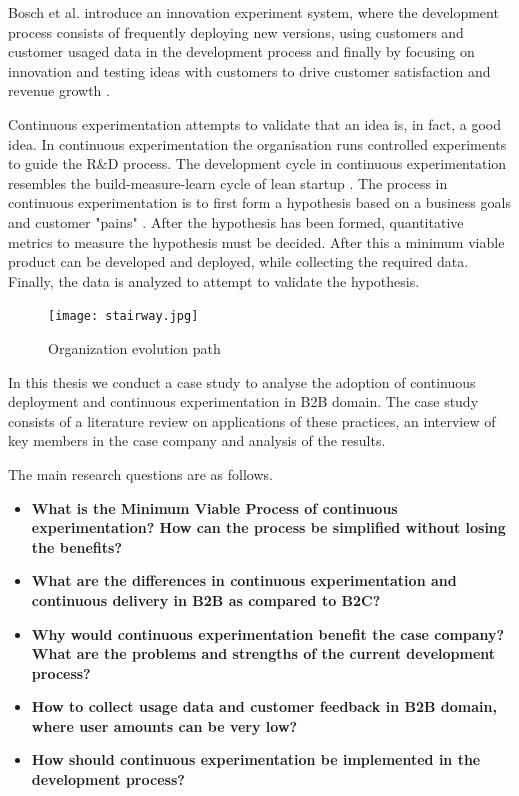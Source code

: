 \documentclass[english]{tktltiki2}
\theoremstyle{definition}
\theoremstyle{remark}
\begin{document}
Bosch et al. introduce an innovation experiment system, where the development process consists of frequently deploying new versions, using customers and customer usaged data in the development process and finally by focusing on innovation and testing ideas with customers to drive customer satisfaction and revenue growth \cite{bosch2012building}. 

Continuous experimentation attempts to validate that an idea is, in fact, a good idea. In continuous experimentation the organisation runs controlled experiments to guide the R\&D process. The development cycle in continuous experimentation resembles the build-measure-learn cycle of lean startup \cite{ries2011lean}. The process in continuous experimentation is to first form a hypothesis based on a business goals and customer "pains" \cite{bosch2012building}. After the hypothesis has been formed, quantitative metrics to measure the hypothesis must be decided. After this a minimum viable product can be developed and deployed, while collecting the required data. Finally, the data is analyzed to attempt to validate the hypothesis.


\begin{figure}[H]
	\centering
	\texttt{[image: stairway.jpg]}
	\caption{Organization evolution path \cite{http://www.janbosch.com/Jan_Bosch/Software_Engineering.html}}
	\label{fig1}
\end{figure}

In this thesis we conduct a case study to analyse the adoption of continuous deployment and continuous experimentation in B2B domain. The case study consists of a literature review on applications of these practices, an interview of key members in the case company and analysis of the results. 

The main research questions are as follows.
\begin{itemize}
\item  \textbf{What is the Minimum Viable Process of continuous experimentation? How can the process be simplified without losing the benefits?}
\item  \textbf{What are the differences in continuous experimentation and continuous delivery in B2B as compared to B2C?}
\item  \textbf{Why would continuous experimentation benefit the case company? What are the problems and strengths of the current development process?}
\item  \textbf{How to collect usage data and customer feedback in B2B domain, where user amounts can be very low?}
\item  \textbf{How should continuous experimentation be implemented in the development process?}
\end{itemize}
\end{document}
